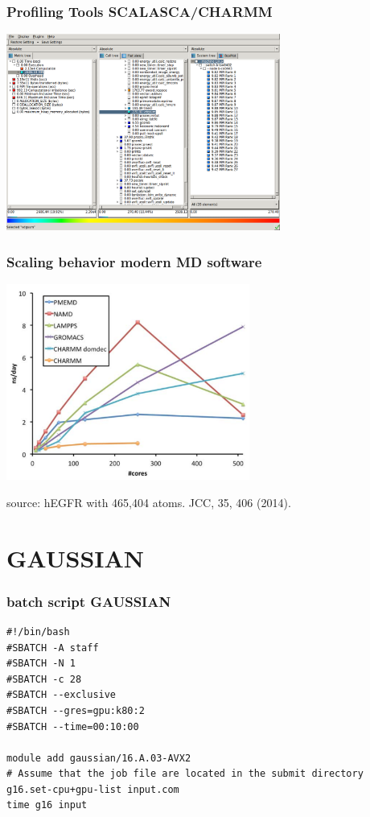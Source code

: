
\begin{frame}
	\frametitle{Profiling Tools SCALASCA/CHARMM}
        \begin{center}
		\includegraphics[width=9cm]{images/cube_charmm.png}
        \end{center}
\end{frame}


\begin{frame}
	\frametitle{Scaling behavior modern MD software}
        \begin{center}
		\includegraphics[width=8cm]{images/software_scaling.png}
        \end{center}

{\tiny
source: hEGFR with 465,404 atoms. JCC, 35, 406 (2014).
}
\end{frame}



\section{GAUSSIAN}
\begin{frame}[fragile]
	\frametitle{batch script GAUSSIAN}
  
        \begin{verbatim}             
#!/bin/bash
#SBATCH -A staff
#SBATCH -N 1
#SBATCH -c 28
#SBATCH --exclusive
#SBATCH --gres=gpu:k80:2
#SBATCH --time=00:10:00

module add gaussian/16.A.03-AVX2
# Assume that the job file are located in the submit directory
g16.set-cpu+gpu-list input.com
time g16 input

        \end{verbatim}

\end{frame}

